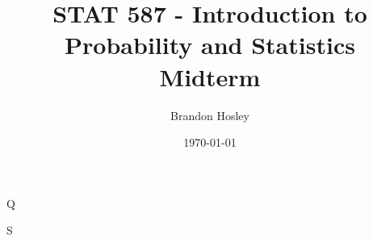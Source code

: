 \documentclass[answers]{exam}
\title{STAT 587 - Introduction to Probability and Statistics%
	\\ Midterm}
\author{Brandon Hosley}
\date{\today}
\begin{document}
\maketitle
\begin{questions}

\question 
Q
\begin{solution}
	S
\end{solution}


\end{questions}
\end{document}
